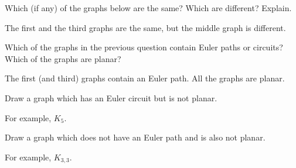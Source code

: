 \begin{questions}

	
\question Which (if any) of the graphs below are the same?  Which are different?  Explain.

\begin{center}
  \hfill
  \hfill
\end{center}

	\begin{answer}
		The first and the third graphs are the same, but the middle graph is different.
	\end{answer}
	
	
	


\question Which of the graphs in the previous question contain Euler paths or circuits?  Which of the graphs are planar?

	\begin{answer}
		The first (and third) graphs contain an Euler path.  All the graphs are planar.
	\end{answer}
	
	
	



\question Draw a graph which has an Euler circuit but is not planar.

	\begin{answer}
		For example, $K_5$.
	\end{answer}
	
	
	


\question Draw a graph which does not have an Euler path and is also not planar.

	\begin{answer}
		For example, $K_{3,3}$.
	\end{answer}
	

\end{questions}
